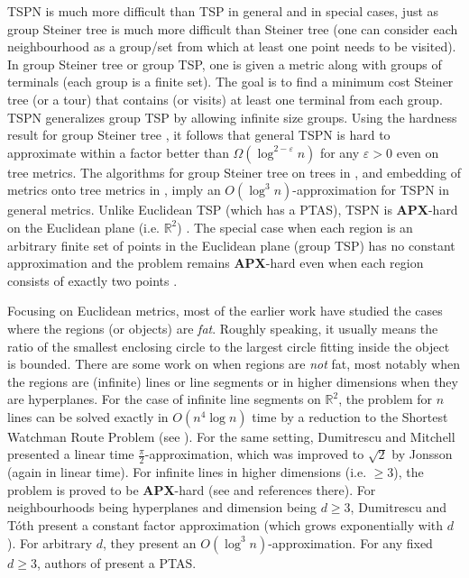 \documentclass[10pt,a4paper]{amsart}
\theoremstyle{thmstyleone}
\newcommand{\RR}{\mathbb{R}}
\newcommand{\eps}{\varepsilon}
\begin{document}
	TSPN is much more difficult than TSP in general and in special cases, just as group Steiner tree is much more difficult than Steiner tree (one can consider each neighbourhood as a group/set from which at least one point needs to be visited). In group Steiner tree or group TSP, one is given a metric along with groups of terminals (each group is a finite set). The goal is to find a minimum cost Steiner tree (or a tour) that contains (or visits) at least one terminal from each group. TSPN generalizes group TSP by allowing infinite size groups. Using the hardness result for group Steiner tree \cite{HK03}, it follows that general TSPN is hard to approximate within a factor better than $\Omega(\log^{2-\eps} n)$ for any $\eps>0$ even on tree metrics. The algorithms for group Steiner tree on trees in \cite{Garg98}, and embedding of metrics onto tree metrics in \cite{FRT04}, imply an $O(\log^3 n)$-approximation for TSPN in general metrics.  
	Unlike Euclidean TSP (which has a PTAS), TSPN is \textbf{APX}-hard on the Euclidean plane (i.e. $\RR^2$) \cite{Berg05}. 
	The special case when each region is an arbitrary finite set of points in the Euclidean plane (group TSP) has no constant
	approximation \cite{SafraS03} and the problem remains \textbf{APX}-hard even when each region consists of exactly two points \cite{DO08}.
	
	Focusing on Euclidean metrics, most of the earlier work have studied the cases where the regions (or objects) are {\em fat}. Roughly speaking, it usually means the ratio of the smallest enclosing circle to the largest circle fitting inside the object is bounded. There are some work on when regions are {\em not} fat, most notably when the regions are (infinite) lines or line segments or in higher dimensions when they  are hyperplanes. For the case of infinite line segments on $\RR^2$, the problem for $ n $ lines can be solved exactly in $O(n^4\log n)$ time by a reduction
	to the Shortest Watchman Route Problem (see \cite{DELM03,Jonsson02}). For the same setting,
	Dumitrescu and Mitchell \cite{DM03} presented a linear time $\frac{\pi}{2}$-approximation, which was improved to $\sqrt{2}$ by Jonsson \cite{Jonsson02} (again in linear time).
	For infinite lines in higher dimensions (i.e. $\geq 3$), the problem is proved to be \textbf{APX}-hard (see \cite{AKL022} and references there). For neighbourhoods being hyperplanes and dimension being $d\geq 3$, Dumitrescu and T\'{o}th \cite{DM16} present a constant factor approximation (which grows exponentially with $d$). For arbitrary $d$, they  present an $O(\log^3 n)$-approximation. For any fixed $d\geq 3$, authors of \cite{AF20} present a PTAS.
	
\end{document}
